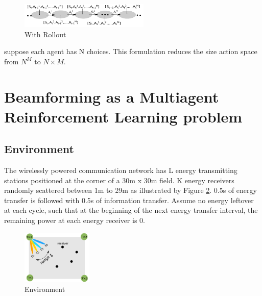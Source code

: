 \documentclass[journal]{IEEEtran}
\begin{document}
\begin{figure}[H]
\centering
\includegraphics[width=0.55\textwidth]{with.png}
\caption{With Rollout}
\label{fig:with}
\end{figure}
suppose each agent has N choices. This formulation reduces the size action space from $N^M$ to $N \times M$.


\section{Beamforming as a Multiagent Reinforcement Learning problem}
\subsection{Environment}
The wirelessly powered communication network has L energy transmitting stations positioned at the corner of a 30m x 30m field. K energy receivers randomly scattered between 1m to 29m as illustrated by Figure \ref{fig:environment}. 0.5s of energy transfer is followed with 0.5s of information transfer. Assume no energy leftover at each cycle, such that at the beginning of the next energy transfer interval, the remaining power at each energy receiver is 0.


\begin{figure}[H]
\centering
\includegraphics[width=0.3\textwidth]{environment.png}
\caption{Environment}
\label{fig:environment}
\end{figure}
\end{document}
